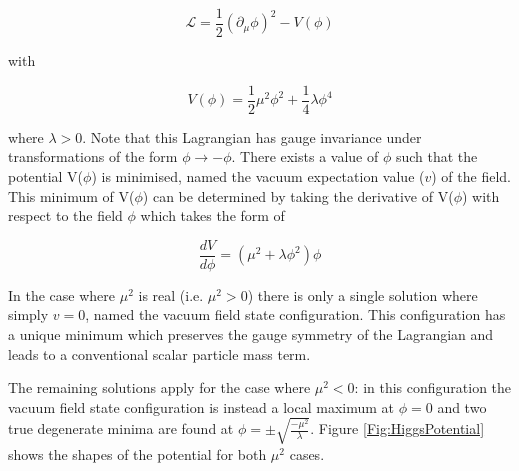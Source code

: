 \documentclass[12pt,a4paper,epsf,portrait,times,epsfig]{report}
\begin{document}
	\begin{equation}
		\mathcal{L} = \frac{1}{2}(\partial_{\mu}\phi)^{2}-V(\phi)
	\end{equation}

	with

	\begin{equation} \label{eq:HiggsPotential}
		V(\phi) = \frac{1}{2}\mu^{2}\phi^{2} + \frac{1}{4}\lambda\phi^{4}
	\end{equation}

	where $\lambda > 0$. Note that this Lagrangian has gauge invariance under transformations of the form $\phi \rightarrow -\phi$. There exists a value of $\phi$ such that the potential V($\phi$) is minimised, named the vacuum expectation value ($v$) of the field. This minimum of V($\phi$) can be determined by taking the derivative of V($\phi$) with respect to the field $\phi$ which takes the form of

	\begin{equation}
		\frac{dV}{d\phi}=(\mu^{2} + \lambda\phi^{2})\phi
	\end{equation}

	In the case where $\mu^{2}$ is real (i.e. $\mu^{2} > 0$) there is only a single solution where simply $v = 0$, named the vacuum field state configuration. This configuration has a unique minimum which preserves the gauge symmetry of the Lagrangian and leads to a conventional scalar particle mass term. \par

	The remaining solutions apply for the case where $\mu^{2} < 0$: in this configuration the vacuum field state configuration is instead a local maximum at $\phi = 0$ and two true degenerate minima are found at $\phi = \pm \sqrt{\frac{-\mu^{2}}{\lambda}}$. Figure \ref{Fig:HiggsPotential} shows the shapes of the potential for both $\mu^2$ cases.  
\end{document}
